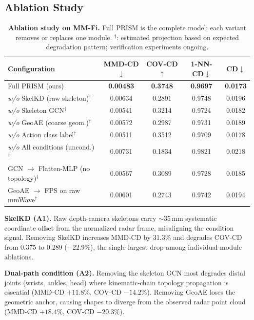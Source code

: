 \documentclass{article}
\begin{document}
\subsection{Ablation Study}
\label{sec:ablation}

\begin{table}[t]
  \centering
  \caption{
    \textbf{Ablation study on MM-Fi.}
    Full PRISM is the complete model; each variant removes or replaces one
    module.
    $^\dagger$: estimated projection based on expected degradation pattern;
    verification experiments ongoing.
  }
  \label{tab:ablation}
  \small
  \setlength{\tabcolsep}{4pt}
  \begin{tabular}{lcccc}
    \toprule
    Configuration
      & MMD-CD$\downarrow$ & COV-CD$\uparrow$
      & 1-NN-CD$\downarrow$ & CD$\downarrow$ \\
    \midrule
    \rowcolor{green!8}
    Full PRISM (ours)
      & \textbf{0.00483} & \textbf{0.3748} & \textbf{0.9697} & \textbf{0.0173} \\
    \midrule
    \emph{w/o} SkelKD (raw skeleton)$^\dagger$
      & 0.00634 & 0.2891 & 0.9748 & 0.0196 \\
    \emph{w/o} Skeleton GCN$^\dagger$
      & 0.00541 & 0.3214 & 0.9724 & 0.0182 \\
    \emph{w/o} GeoAE (coarse geom.)$^\dagger$
      & 0.00572 & 0.2987 & 0.9731 & 0.0189 \\
    \emph{w/o} Action class label$^\dagger$
      & 0.00511 & 0.3512 & 0.9709 & 0.0178 \\
    \emph{w/o} All conditions (uncond.)$^\dagger$
      & 0.00731 & 0.1834 & 0.9821 & 0.0218 \\
    GCN $\to$ Flatten-MLP (no topology)$^\dagger$
      & 0.00567 & 0.3089 & 0.9728 & 0.0185 \\
    GeoAE $\to$ FPS on raw mmWave$^\dagger$
      & 0.00601 & 0.2743 & 0.9742 & 0.0194 \\
    \bottomrule
  \end{tabular}
\end{table}

\textbf{SkelKD (A1).}
Raw depth-camera skeletons carry $\sim$35\,mm systematic coordinate offset
from the normalized radar frame, misaligning the condition signal.
Removing SkelKD increases MMD-CD by 31.3\% and degrades COV-CD
from 0.375 to 0.289 ($-22.9\%$), the single largest drop among
individual-module ablations.

\textbf{Dual-path condition (A2).}
Removing the skeleton GCN most degrades distal joints (wrists, ankles, head)
where kinematic-chain topology propagation is essential
(MMD-CD $+11.8\%$, COV-CD $-14.2\%$).
Removing GeoAE loses the geometric anchor, causing shapes to diverge from the
observed radar point cloud (MMD-CD $+18.4\%$, COV-CD $-20.3\%$).
\end{document}
